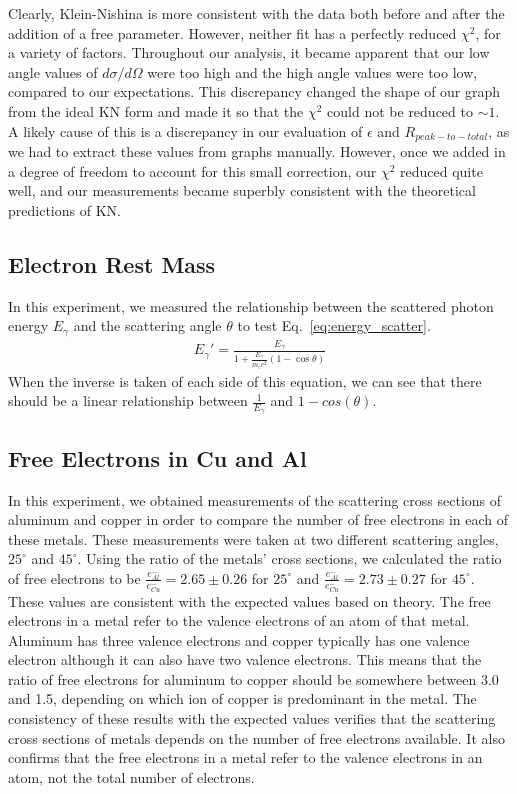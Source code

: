 \documentclass[%
 reprint,
 amsmath,amssymb,
 aps,
 pra,
]{revtex4-1}
\begin{document}
\noindent Clearly, Klein-Nishina is more consistent with the data both before and after the addition of a free parameter. However, neither fit has a perfectly reduced $\chi^2$, for a variety of factors. Throughout our analysis, it became apparent that our low angle values of $d\sigma / d\Omega$ were too high and the high angle values were too low, compared to our expectations. This discrepancy changed the shape of our graph from the ideal KN form and made it so that the $\chi^2$ could not be reduced to $\sim 1$. A likely cause of this is a discrepancy in our evaluation of $\epsilon$ and $R_{peak-to-total}$, as we had to extract these values from graphs manually. However, once we added in a degree of freedom to account for this small correction, our $\chi^2$ reduced quite well, and our measurements became superbly consistent with the theoretical predictions of KN.

\subsection{Electron Rest Mass}
In this experiment, we measured the relationship between the scattered photon energy $E_{\gamma}$ and the scattering angle $\theta$ to test Eq.~\ref{eq:energy_scatter}.
\begin{gather*}
	E_\gamma ' = \frac{E_\gamma}{1 + \frac{E_\gamma}{m_e c^2} (1 - \cos{\theta})}
\end{gather*}
When the inverse is taken of each side of this equation, we can see that there should be a linear relationship between $\frac{1}{E_{\gamma}}$ and $1 - cos(\theta)$. 

\subsection{Free Electrons in Cu and Al}
In this experiment, we obtained measurements of the scattering cross sections of aluminum and copper in order to compare the number of free electrons in each of these metals. These measurements were taken at two different scattering angles, $25^{\circ}$ and $45^{\circ}$. Using the ratio of the metals' cross sections, we calculated the ratio of free electrons to be $\frac{e^{-}_{Al}}{e^{-}_{Cu}} = 2.65 \pm 0.26$ for $25^{\circ}$ and $\frac{e^{-}_{Al}}{e^{-}_{Cu}} = 2.73 \pm 0.27$ for $45^{\circ}$. These values are consistent with the expected values based on theory. The free electrons in a metal refer to the valence electrons of an atom of that metal. Aluminum has three valence electrons and copper typically has one valence electron although it can also have two valence electrons. This means that the ratio of free electrons for aluminum to copper should be somewhere between 3.0 and 1.5, depending on which ion of copper is predominant in the metal. The consistency of these results with the expected values verifies that the scattering cross sections of metals depends on the number of free electrons available. It also confirms that the free electrons in a metal refer to the valence electrons in an atom, not the total number of electrons.
\end{document}
